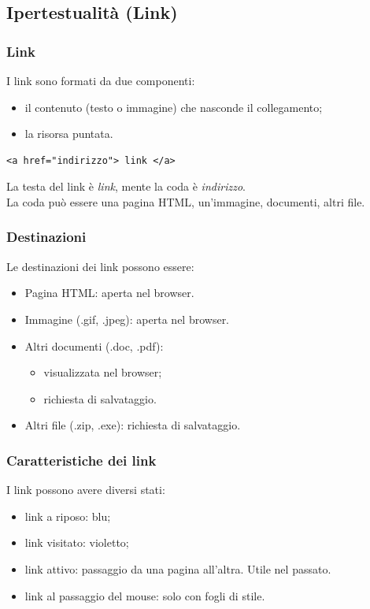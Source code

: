 \documentclass{article}
\begin{document}
\subsection{Ipertestualità (Link)}
\subsubsection{Link}
I link sono formati da due componenti:
\begin{itemize}
    \item il contenuto (testo o immagine) che nasconde il collegamento;
    \item la risorsa puntata.
\end{itemize}
\begin{lstlisting}[style=htmlstyle]
<a href="indirizzo"> link </a>
\end{lstlisting}
La testa del link è \textit{link}, mente la coda è \textit{indirizzo}.
\\ La coda può essere una pagina HTML, un'immagine, documenti, altri file.
\subsubsection{Destinazioni}
Le destinazioni dei link possono essere:
\begin{itemize}
    \item Pagina HTML: aperta nel browser.
    \item Immagine (.gif, .jpeg): aperta nel browser.
    \item Altri documenti (.doc, .pdf):
          \begin{itemize}
              \item visualizzata nel browser;
              \item richiesta di salvataggio.
          \end{itemize}
    \item Altri file (.zip, .exe): richiesta di salvataggio.
\end{itemize}
\subsubsection{Caratteristiche dei link}
I link possono avere diversi stati:
\begin{itemize}
    \item link a riposo: \textcolor[HTML]{0000FF}{blu};
    \item link visitato: \textcolor[HTML]{800080}{violetto};
    \item link attivo: passaggio da una pagina all'altra. Utile nel passato.
    \item link al passaggio del mouse: solo con fogli di stile.
\end{itemize}
\end{document}

